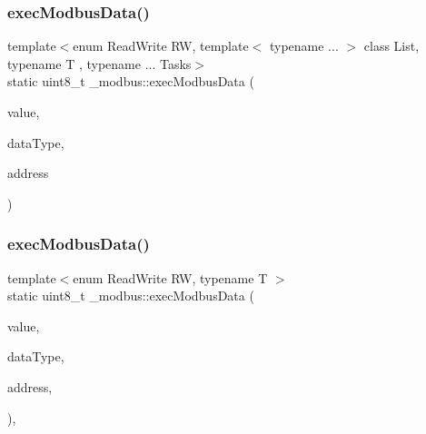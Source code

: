 \hypertarget{namespace__modbus_a0742ac6898215f382cee074b310d12ba}{}\label{namespace__modbus_a0742ac6898215f382cee074b310d12ba} 
\subsubsection{\texorpdfstring{exec\+Modbus\+Data()}{execModbusData()}\hspace{0.1cm}{\footnotesize\ttfamily [1/3]}}
{\footnotesize\ttfamily template$<$enum Read\+Write RW, template$<$ typename ... $>$ class List, typename T , typename ... Tasks$>$ \\
static uint8\+\_\+t \+\_\+modbus\+::exec\+Modbus\+Data (\begin{DoxyParamCaption}\item[{uint16\+\_\+t \&}]{value,  }\item[{const enum \hyperlink{namespace__modbus_a85902c8bc1ff424855dad072259df913}{Data\+Type} \&}]{data\+Type,  }\item[{const uint16\+\_\+t \&}]{address }\end{DoxyParamCaption})\hspace{0.3cm}{\ttfamily [static]}}

\hypertarget{namespace__modbus_a2065bae9b1040bd1b1b6913f39793370}{}\label{namespace__modbus_a2065bae9b1040bd1b1b6913f39793370} 
\subsubsection{\texorpdfstring{exec\+Modbus\+Data()}{execModbusData()}\hspace{0.1cm}{\footnotesize\ttfamily [2/3]}}
{\footnotesize\ttfamily template$<$enum Read\+Write RW, typename T $>$ \\
static uint8\+\_\+t \+\_\+modbus\+::exec\+Modbus\+Data (\begin{DoxyParamCaption}\item[{uint16\+\_\+t \&}]{value,  }\item[{const enum \hyperlink{namespace__modbus_a85902c8bc1ff424855dad072259df913}{Data\+Type} \&}]{data\+Type,  }\item[{const uint16\+\_\+t \&}]{address,  }\item[{\+\_\+task\+\_\+list\+::\+Task\+List$<$ T $>$}]{ }\end{DoxyParamCaption})\hspace{0.3cm}{\ttfamily [inline]}, {\ttfamily [static]}}

